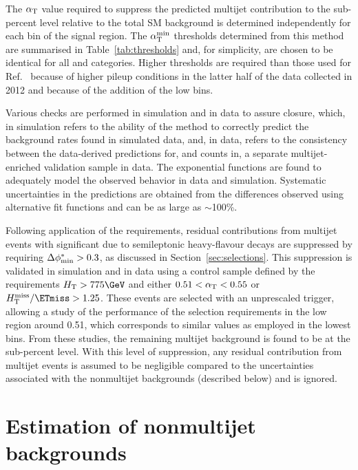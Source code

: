 The $\alpha_\mathrm{T}$ value required to suppress the predicted multijet
contribution to the sub-percent level relative to the total SM
background is determined independently for each bin of the signal
region. The $\alpha_\mathrm{T}^\text{min}$ thresholds determined from this method are
summarised in Table~\ref{tab:thresholds} and, for simplicity, are
chosen to be identical for all \njet and \nb categories. Higher
\alphat thresholds are required than those used for
Ref.~\cite{RA1Paper2012} because of higher pileup conditions in the
latter half of the data collected in 2012 and because of the addition
of the low \scalht bins.

Various checks are performed in simulation and in data to assure
closure, which, in simulation refers to the ability of the method to
correctly predict the background rates found in simulated data, and,
in data, refers to the consistency between the data-derived
predictions for, and counts in, a separate multijet-enriched
validation sample in data. The exponential functions are found to
adequately model the observed behavior in data and
simulation. Systematic uncertainties in the predictions are obtained
from the differences observed using alternative fit functions and can
be as large as $\sim$100\%.

Following application of the \alphat requirements, residual
contributions from multijet events with significant \ptvecmiss due to
semileptonic heavy-flavour decays are suppressed by requiring $\Delta\phi^{*}_\text{min} >
0.3$, as discussed in Section~\ref{sec:selections}. This suppression
is validated in simulation and in data using a control sample defined
by the requirements $\scalht > 775 \GeV$ and either $0.51 < \alpha_\mathrm{T} <
0.55$ or $\mhtmet > 1.25$.  These events are selected with an
unprescaled \scalht trigger, allowing a study of the performance of
the selection requirements in the low \alphat region around 0.51,
which corresponds to similar \HTmiss values as employed in the lowest
\scalht bins.  From these studies, the remaining multijet background
is found to be at the sub-percent level. With this level of
suppression, any residual contribution from multijet events is assumed
to be negligible compared to the uncertainties associated with the
nonmultijet backgrounds (described below) and is ignored.


\section{Estimation of nonmultijet backgrounds\label{sec:ewk}}

